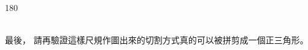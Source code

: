 \documentclass{article}
\begin{document}
\begin{turn}{180}
\begin{solution*}
\begin{minipage}{0.35\textwidth}
		\end{minipage}\\
		最後，
		請再驗證這樣尺規作圖出來的切割方式真的可以被拼剪成一個正三角形。
		\asDemonstrated
	\end{solution*}
\end{turn}
\end{document}
